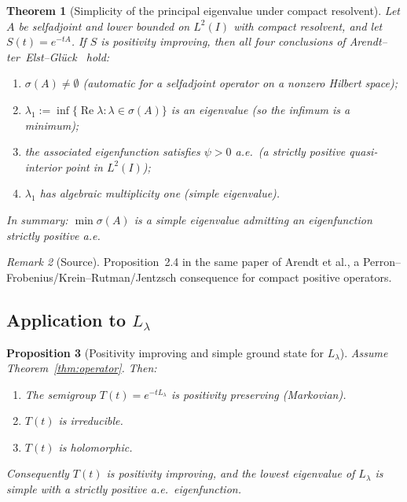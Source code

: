 \documentclass[11pt]{article}
\newtheorem{theorem}{Theorem}
\newtheorem{proposition}[theorem]{Proposition}
\theoremstyle{remark}
\newtheorem{remark}[theorem]{Remark}
\newcommand{\1}{\mathbf 1}
\begin{document}
\begin{theorem}[Simplicity of the principal eigenvalue under compact resolvent]
\label{thm:principal-simple}
Let $A$ be selfadjoint and lower bounded on $L^2(I)$ with compact resolvent, and let $S(t)=e^{-tA}$.
If $S$ is positivity improving, then all four conclusions of
Arendt--ter~Elst--Gl\"{u}ck~\cite[Prop.~2.4]{ATGStrictPos2020} hold:
\begin{enumerate}
\item[(a)] $\sigma(A)\ne\emptyset$ (automatic for a selfadjoint operator on a nonzero Hilbert space);
\item[(b)] $\lambda_1:=\inf\{\operatorname{Re}\lambda:\lambda\in\sigma(A)\}$ is an eigenvalue
  (so the infimum is a minimum);
\item[(c)] the associated eigenfunction satisfies $\psi>0$ a.e.\ (a strictly positive quasi-interior
  point in $L^2(I)$);
\item[(d)] $\lambda_1$ has algebraic multiplicity one (simple eigenvalue).
\end{enumerate}
In summary: $\min\sigma(A)$ is a simple eigenvalue admitting an eigenfunction strictly positive a.e.
\end{theorem}

\begin{remark}[Source]
Proposition~2.4 in the same paper of Arendt et al.,
a Perron--Frobenius/Krein--Rutman/Jentzsch consequence for compact positive operators.
\end{remark}

\subsection{Application to $L_\lambda$}

\begin{proposition}[Positivity improving and simple ground state for $L_\lambda$]
\label{prop:groundstate}
Assume Theorem~\ref{thm:operator}. Then:
\begin{enumerate}
\item The semigroup $T(t)=e^{-tL_\lambda}$ is positivity preserving (Markovian).
\item $T(t)$ is irreducible.
\item $T(t)$ is holomorphic.
\end{enumerate}
Consequently $T(t)$ is positivity improving, and the lowest eigenvalue of $L_\lambda$ is simple with a
strictly positive a.e.\ eigenfunction.
\end{proposition}
\end{document}
